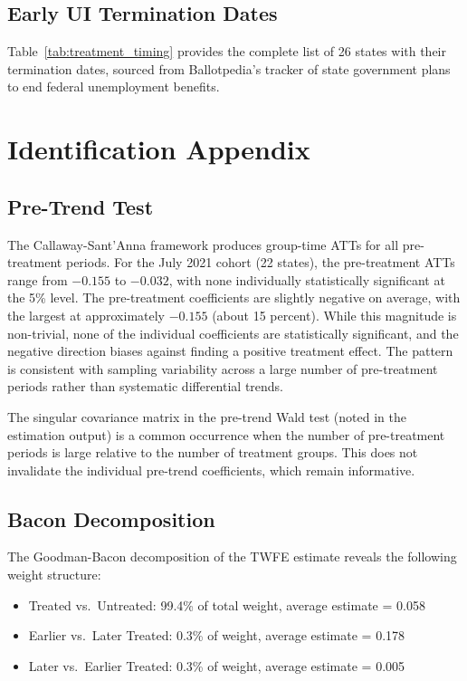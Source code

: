 \documentclass[12pt]{article}
\begin{document}
\subsection{Early UI Termination Dates}

Table~\ref{tab:treatment_timing} provides the complete list of 26 states with their termination dates, sourced from Ballotpedia's tracker of state government plans to end federal unemployment benefits.



\section{Identification Appendix}

\subsection{Pre-Trend Test}

The Callaway-Sant'Anna framework produces group-time ATTs for all pre-treatment periods. For the July 2021 cohort (22 states), the pre-treatment ATTs range from $-0.155$ to $-0.032$, with none individually statistically significant at the 5\% level. The pre-treatment coefficients are slightly negative on average, with the largest at approximately $-0.155$ (about 15 percent). While this magnitude is non-trivial, none of the individual coefficients are statistically significant, and the negative direction biases against finding a positive treatment effect. The pattern is consistent with sampling variability across a large number of pre-treatment periods rather than systematic differential trends.

The singular covariance matrix in the pre-trend Wald test (noted in the estimation output) is a common occurrence when the number of pre-treatment periods is large relative to the number of treatment groups. This does not invalidate the individual pre-trend coefficients, which remain informative.

\subsection{Bacon Decomposition}

The Goodman-Bacon decomposition of the TWFE estimate reveals the following weight structure:

\begin{itemize}
\item Treated vs.\ Untreated: 99.4\% of total weight, average estimate = 0.058
\item Earlier vs.\ Later Treated: 0.3\% of weight, average estimate = 0.178
\item Later vs.\ Earlier Treated: 0.3\% of weight, average estimate = 0.005
\end{itemize}
\end{document}
